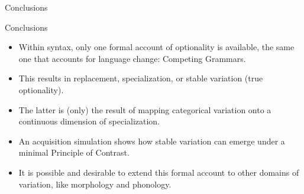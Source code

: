 \documentclass[hyperref={pdfpagelabels=false}]{beamer}
\begin{document}
\begin{frame}{Conclusions}
	\begin{block}{Conclusions}
		\begin{itemize}
			\item Within syntax, only one formal account of optionality is available, the same one that accounts for language change: Competing Grammars.
			\item This results in replacement, specialization, or stable variation (true optionality).
			\item The latter is (only) the result of mapping categorical variation onto a continuous dimension of specialization.
			\item An acquisition simulation shows how stable variation can emerge under a minimal Principle of Contrast.
			\item It is possible and desirable to extend this formal account to other domains of variation, like morphology and phonology.
		\end{itemize}
	\end{block}


\end{frame}


%
%
\end{document}
